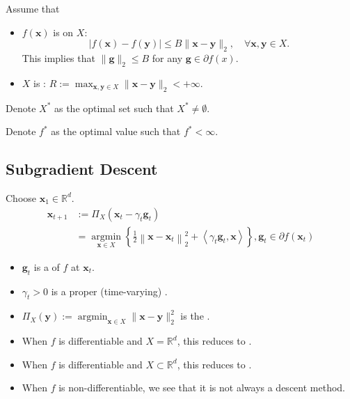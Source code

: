 Assume that
\begin{itemize}[leftmargin=*]
    \item $f(\mathbf{x})$ is  on $X$:
$$
|f(\mathbf{x})-f(\mathbf{y})| \leq B\|\mathbf{x}-\mathbf{y}\|_{2}, \quad \forall \mathbf{x}, \mathbf{y} \in X .
$$
This implies that $\|\mathbf{g}\|_{2} \leq B$ for any $\mathbf{g} \in \partial f(x)$.
    \item $X$ is : $R:=\displaystyle \max _{\mathbf{x}, \mathbf{y} \in X}\|\mathbf{x}-\mathbf{y}\|_{2}<+\infty$.
\end{itemize}

Denote $X^{*}$ as the optimal set such that $X^{*} \neq \emptyset$.

Denote $f^{*}$ as the optimal value such that $f^{*}<\infty$.







\subsection*{Subgradient Descent}
Choose $\mathbf{x}_{1} \in \mathbb{R}^{d}$.
$$
\begin{aligned}
    \mathbf{x}_{t+1}&:=\Pi_{X}\left(\mathbf{x}_{t}-\gamma_{t} \mathbf{g}_{t}\right) \\
&=\underset{\mathbf{x} \in X}{\operatorname{argmin}}\left\{\frac{1}{2}\left\|\mathbf{x}-\mathbf{x}_{t}\right\|_{2}^{2}+\left\langle\gamma_{t} \mathbf{g}_{t}, \mathbf{x}\right\rangle\right\},  \mathbf{g}_{t} \in \partial f\left(\mathbf{x}_{t}\right)
\end{aligned}
$$
\begin{itemize}[leftmargin=*]
    \item $\mathbf{g}_{t}$ is a  of $f$ at $\mathbf{x}_{t}$.
    \item $\gamma_{t}>0$ is a proper (time-varying) .
    \item $\Pi_{X}(\mathbf{y}):=\operatorname{argmin}_{\mathbf{x} \in X}\|\mathbf{x}-\mathbf{y}\|_{2}^{2}$ is the .
    \item When $f$ is differentiable and $X=\mathbb{R}^{d}$, this reduces to .
    \item When $f$ is differentiable and $X \subset \mathbb{R}^{d}$, this reduces to .
    \item When $f$ is non-differentiable, we see that it is not always a descent method.
\end{itemize}






